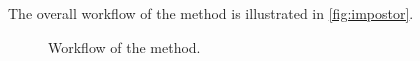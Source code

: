 The overall workflow of the method is illustrated in \autoref{fig:impostor}.

\begin{figure}[htbp]
    \centering
    
    \caption{Workflow of the \imp{} method.}
    \label{fig:impostor}
\end{figure}









